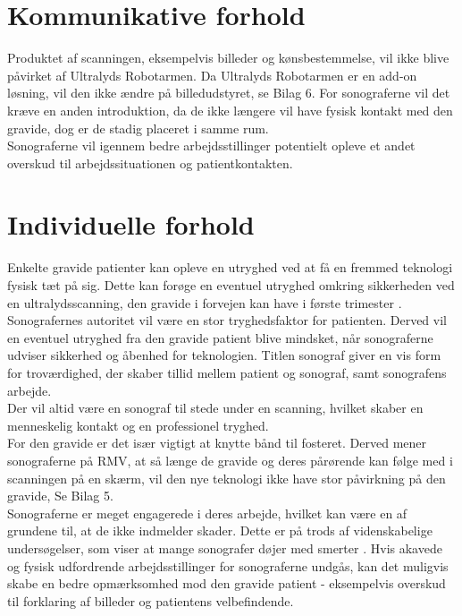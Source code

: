 \section{Kommunikative forhold}
Produktet af scanningen, eksempelvis billeder og kønsbestemmelse, vil ikke blive påvirket af Ultralyds Robotarmen. Da Ultralyds Robotarmen er en add-on løsning, vil den ikke ændre på billedudstyret, se Bilag 6. 
For sonograferne vil det kræve en anden introduktion, da de ikke længere vil have fysisk kontakt med den gravide, dog er de stadig placeret i samme rum.  \\
Sonograferne vil igennem bedre arbejdsstillinger potentielt opleve et andet overskud til arbejdssituationen og patientkontakten.  

\section{Individuelle forhold}
Enkelte gravide patienter kan opleve en utryghed ved at få en fremmed teknologi fysisk tæt på sig. Dette kan forøge en eventuel utryghed omkring sikkerheden ved en ultralydsscanning, den gravide i forvejen kan have i første trimester \cite{29}. \\
Sonografernes autoritet vil være en stor tryghedsfaktor for patienten. Derved vil en eventuel utryghed fra den gravide patient blive mindsket, når sonograferne udviser sikkerhed og åbenhed for teknologien. Titlen sonograf giver en vis form for troværdighed, der skaber tillid mellem patient og sonograf, samt sonografens arbejde.\\
Der vil altid være en sonograf til stede under en scanning, hvilket skaber en menneskelig kontakt og en professionel tryghed.\\
For den gravide er det især vigtigt at knytte bånd til fosteret. Derved mener sonograferne på RMV, at så længe de gravide og deres pårørende kan følge med i scanningen på en skærm, vil den nye teknologi ikke have stor påvirkning på den gravide, Se Bilag 5. \\  
Sonograferne er meget engagerede i deres arbejde, hvilket kan være en af grundene til, at de ikke indmelder skader. Dette er på trods af videnskabelige undersøgelser, som viser at mange sonografer døjer med smerter \cite{32}. 
Hvis akavede og fysisk udfordrende arbejdsstillinger for sonograferne undgås, kan det muligvis skabe en bedre opmærksomhed mod den gravide patient - eksempelvis overskud til forklaring af billeder og patientens velbefindende.  

